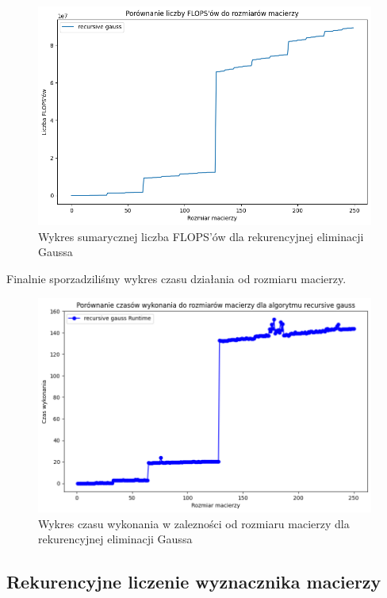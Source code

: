 \documentclass{article}
\begin{document}
\begin{figure}[H]
  \centering
    \includegraphics[width=0.99\textwidth]{gauss_flops.png}
  \caption{Wykres sumarycznej liczba FLOPS'ów dla rekurencyjnej eliminacji Gaussa}
\end{figure}

\noindent
Finalnie sporzadziliśmy wykres czasu działania od rozmiaru macierzy.

\begin{figure}[H]
  \centering
    \includegraphics[width=0.99\textwidth]{gauss_time.png}
  \caption{Wykres czasu wykonania w zalezności od rozmiaru macierzy dla rekurencyjnej eliminacji Gaussa}
\end{figure}

\subsection{Rekurencyjne liczenie wyznacznika macierzy}
\end{document}
